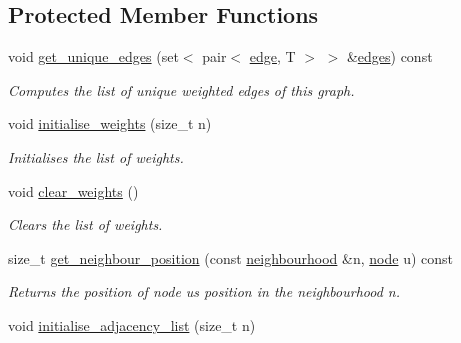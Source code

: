 \subsection*{Protected Member Functions}
\begin{DoxyCompactItemize}
\item 
void \hyperlink{classlgraph_1_1utils_1_1wugraph_a365789840be9490091e6d8de03521cad}{get\+\_\+unique\+\_\+edges} (set$<$ pair$<$ \hyperlink{namespacelgraph_1_1utils_a6510284ce1b1ae5dc97ce5d2de426e10}{edge}, T $>$ $>$ \&\hyperlink{classlgraph_1_1utils_1_1wxgraph_a73b6c8887d5088750ee2cc98c45089c6}{edges}) const 
\begin{DoxyCompactList}\small\item\em Computes the list of unique weighted edges of this graph. \end{DoxyCompactList}\item 
void \hyperlink{classlgraph_1_1utils_1_1wxgraph_a0b0c0b54acbc7816eb5b9958e61805cf}{initialise\+\_\+weights} (size\+\_\+t n)\hypertarget{classlgraph_1_1utils_1_1wxgraph_a0b0c0b54acbc7816eb5b9958e61805cf}{}\label{classlgraph_1_1utils_1_1wxgraph_a0b0c0b54acbc7816eb5b9958e61805cf}

\begin{DoxyCompactList}\small\item\em Initialises the list of weights. \end{DoxyCompactList}\item 
void \hyperlink{classlgraph_1_1utils_1_1wxgraph_a145f81ae3609af5ec038ace8b4413fad}{clear\+\_\+weights} ()\hypertarget{classlgraph_1_1utils_1_1wxgraph_a145f81ae3609af5ec038ace8b4413fad}{}\label{classlgraph_1_1utils_1_1wxgraph_a145f81ae3609af5ec038ace8b4413fad}

\begin{DoxyCompactList}\small\item\em Clears the list of weights. \end{DoxyCompactList}\item 
size\+\_\+t \hyperlink{classlgraph_1_1utils_1_1xxgraph_aac7ef2134cad9529869f1334de7892d9}{get\+\_\+neighbour\+\_\+position} (const \hyperlink{namespacelgraph_1_1utils_a0f2ef47028a466d26841709e705390ac}{neighbourhood} \&n, \hyperlink{namespacelgraph_1_1utils_a7bd66ede3805ef121bc2835bd48de0cf}{node} u) const 
\begin{DoxyCompactList}\small\item\em Returns the position of node {\itshape u\textquotesingle{}s} position in the neighbourhood {\itshape n}. \end{DoxyCompactList}\item 
void \hyperlink{classlgraph_1_1utils_1_1xxgraph_a2201aaff5e9ffa29a9b3abfde705dd46}{initialise\+\_\+adjacency\+\_\+list} (size\+\_\+t n)\hypertarget{classlgraph_1_1utils_1_1xxgraph_a2201aaff5e9ffa29a9b3abfde705dd46}{}\label{classlgraph_1_1utils_1_1xxgraph_a2201aaff5e9ffa29a9b3abfde705dd46}


\end{DoxyCompactItemize}
